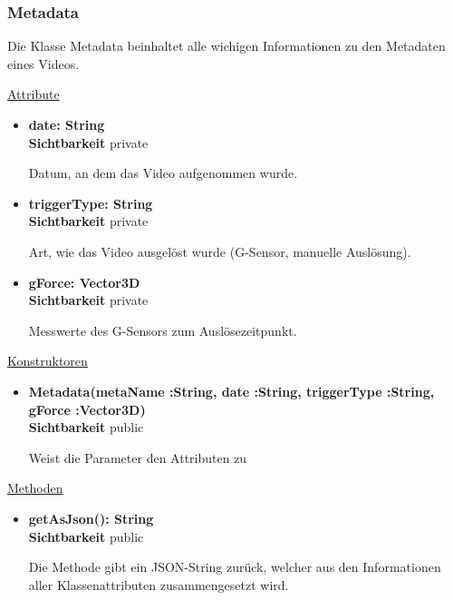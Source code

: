 \subsubsection{Metadata}
Die Klasse Metadata beinhaltet alle wichigen Informationen zu den Metadaten eines Videos. \newline

\underline{Attribute}
\begin{itemize}
\itemsep0pt
\item \textbf{date: String} \hfill\\ 
\textbf{Sichtbarkeit} private 

Datum, an dem das Video aufgenommen wurde.

\item \textbf{triggerType: String} \hfill\\ 
\textbf{Sichtbarkeit} private 

Art, wie das Video ausgelöst wurde (G-Sensor, manuelle Auslösung). 

\item \textbf{gForce: Vector3D} \hfill\\ 
\textbf{Sichtbarkeit} private 

Messwerte des G-Sensors zum Auslösezeitpunkt.

\end{itemize}

\underline{Konstruktoren}
\begin{itemize}
\itemsep0pt
\item \textbf{Metadata(metaName :String, date :String, triggerType :String, gForce :Vector3D)} \hfill\\
\textbf{Sichtbarkeit} public 

Weist die Parameter den Attributen zu

\end{itemize}

\underline{Methoden}
\begin{itemize}
\itemsep0pt
\item \textbf{getAsJson(): String}\hfill\\
\textbf{Sichtbarkeit} public 

Die Methode gibt ein JSON-String zurück, welcher aus den Informationen aller Klassenattributen zusammengesetzt wird.

\end{itemize}